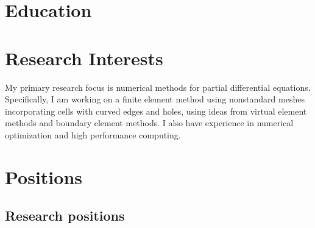 \documentclass[12pt]{moderncv}
\begin{document}
\maketitle



\section{Education}



\section{Research Interests}
    My primary research focus is numerical methods for partial differential equations.
    Specifically, I am working on a finite element method using nonstandard meshes incorporating cells with curved edges and holes, using ideas from virtual element methods and boundary element methods.
    I also have experience in numerical optimization and high performance computing.



\section{Positions}

    \subsection{Research positions}

\end{document}
